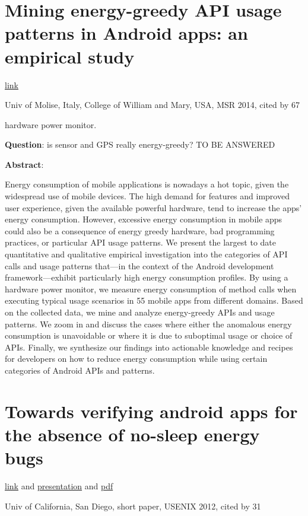 \documentclass{article}
\begin{document}
\section{Mining energy-greedy API usage patterns in Android apps: an empirical
  study}

\href{http://dl.acm.org/citation.cfm?id=2597085}{link}

Univ of Molise, Italy, College of William and Mary, USA, MSR 2014, cited by 67

hardware power monitor.

\textbf{Question}: is sensor and GPS really energy-greedy? TO BE ANSWERED

\textbf{Abstract}:

Energy consumption of mobile applications is nowadays a hot topic, given the
widespread use of mobile devices. The high demand for features and improved user
experience, given the available powerful hardware, tend to increase the apps’
energy consumption. However, excessive energy consumption in mobile apps could
also be a consequence of energy greedy hardware, bad programming practices, or
particular API usage patterns. We present the largest to date quantitative and
qualitative empirical investigation into the categories of API calls and usage
patterns that—in the context of the Android development framework—exhibit
particularly high energy consumption profiles. By using a hardware power
monitor, we measure energy consumption of method calls when executing typical
usage scenarios in 55 mobile apps from different domains. Based on the collected
data, we mine and analyze energy-greedy APIs and usage patterns. We zoom in and
discuss the cases where either the anomalous energy consumption is unavoidable
or where it is due to suboptimal usage or choice of APIs. Finally, we synthesize
our findings into actionable knowledge and recipes for developers on how to
reduce energy consumption while using certain categories of Android APIs and
patterns.

\section{Towards verifying android apps for the absence of no-sleep energy bugs}
\href{http://dl.acm.org/citation.cfm?id=2387872}{link} and
\href{https://www.usenix.org/conference/hotpower12/workshop-program/presentation/vekris}{presentation}
and
\href{https://www.usenix.org/system/files/conference/hotpower12/hotpower12-final27.pdf}{pdf}

Univ of California, San Diego, short paper, USENIX 2012, cited by 31
\end{document}

